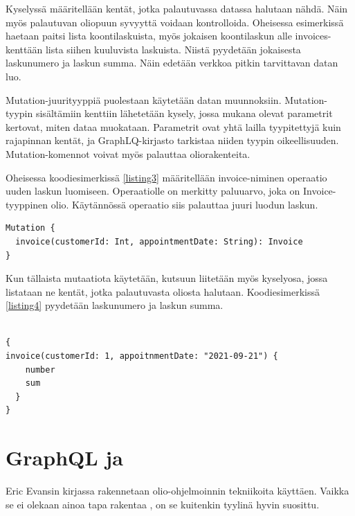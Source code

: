 Kyselyssä määritellään kentät, jotka palautuvassa datassa halutaan
nähdä. Näin myös palautuvan oliopuun syvyyttä voidaan kontrolloida.
Oheisessa esimerkissä haetaan paitsi lista koontilaskuista, myös
jokaisen koontilaskun alle invoices-kenttään lista siihen kuuluvista
laskuista. Niistä pyydetään jokaisesta laskunumero ja laskun summa. Näin
edetään verkkoa pitkin tarvittavan datan luo.

Mutation-juurityyppiä puolestaan käytetään datan muunnoksiin.
Mutation-tyypin sisältämiin kenttiin lähetetään kysely, jossa mukana
olevat parametrit kertovat, miten dataa muokataan. Parametrit ovat yhtä
lailla tyypitettyjä kuin rajapinnan kentät, ja GraphLQ-kirjasto
tarkistaa niiden tyypin oikeellisuuden. Mutation-komennot voivat myös
palauttaa oliorakenteita.

Oheisessa koodiesimerkissä \ref{listing3} määritellään invoice-niminen
operaatio uuden laskun luomiseen. Operaatiolle on merkitty paluuarvo,
joka on Invoice-tyyppinen olio. Käytännössä operaatio siis palauttaa
juuri luodun laskun.

\begin{code}
  \begin{verbatim}
Mutation {
  invoice(customerId: Int, appointmentDate: String): Invoice
}
\end{verbatim}
  \label{listing3}
\end{code}

Kun tällaista mutaatiota käytetään, kutsuun liitetään myös kyselyosa,
jossa listataan ne kentät, jotka palautuvasta oliosta halutaan.
Koodiesimerkissä \ref{listing4} pyydetään laskunumero ja laskun summa.

\begin{code}
  \begin{verbatim}

{
invoice(customerId: 1, appoitnmentDate: "2021-09-21") {
    number
    sum
  }
}
\end{verbatim}
  \label{listing4}
\end{code}

\hypertarget{graphql-ja}{%
\section{\texorpdfstring{GraphQL ja
}{GraphQL ja }}\label{graphql-ja}}

Eric Evansin kirjassa  rakennetaan
olio-ohjelmoinnin tekniikoita käyttäen. Vaikka se ei olekaan ainoa tapa
rakentaa , on se kuitenkin tyylinä hyvin
suosittu.

